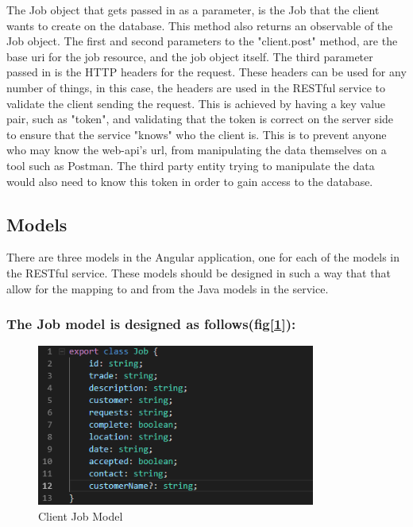 The Job object that gets passed in as a parameter, is the Job that the client wants to create on the database. This method also returns an observable of the Job object. The first and second parameters to the "client.post" method, are the base uri for the job resource, and the job object itself. The third parameter passed in is the HTTP headers for the request. These headers can be used for any number of things, in this case, the headers are used in the RESTful service to validate the client sending the request. This is achieved by having a key value pair, such as "token", and validating that the token is correct on the server side to ensure that the service "knows" who the client is. This is to prevent anyone who may know the web-api's url, from manipulating the data themselves on a tool such as Postman.
The third party entity trying to manipulate the data would also need to know this token in order to gain access to the database.  
\subsection{Models}
\label{sec:SystemDesignModels}

There are three models in the Angular application, one for each of the models in the RESTful service. These models should be designed in such a way that that allow for the mapping to and from the Java models in the service.

\subsubsection{The Job model is designed as follows(fig[\ref{fig:clientJob}]):}

\begin{figure}[H]
    \centering
    \includegraphics[width=\textwidth, height=150pt]{DesignImages/AngularJob.PNG}
    \caption{Client Job Model}
    \label{fig:clientJob}
\end{figure}

